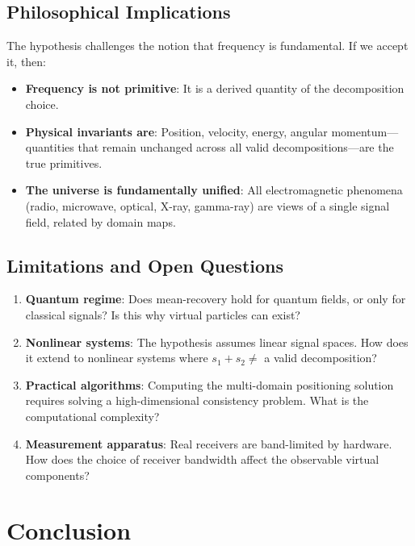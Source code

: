 \documentclass[twocolumn,11pt,a4paper]{article}
\newcommand{\signal}{s}
\begin{document}
\subsection{Philosophical Implications}

The hypothesis challenges the notion that frequency is fundamental. If we accept it, then:

\begin{itemize}[nosep]
  \item \textbf{Frequency is not primitive}: It is a derived quantity of the decomposition choice.

  \item \textbf{Physical invariants are}: Position, velocity, energy, angular momentum—quantities that remain unchanged across all valid decompositions—are the true primitives.

  \item \textbf{The universe is fundamentally unified}: All electromagnetic phenomena (radio, microwave, optical, X-ray, gamma-ray) are views of a single signal field, related by domain maps.
\end{itemize}

\subsection{Limitations and Open Questions}

\begin{enumerate}[nosep]
  \item \textbf{Quantum regime}: Does mean-recovery hold for quantum fields, or only for classical signals? Is this why virtual particles can exist?

  \item \textbf{Nonlinear systems}: The hypothesis assumes linear signal spaces. How does it extend to nonlinear systems where $\signal_1 + \signal_2 \neq$ a valid decomposition?

  \item \textbf{Practical algorithms}: Computing the multi-domain positioning solution requires solving a high-dimensional consistency problem. What is the computational complexity?

  \item \textbf{Measurement apparatus}: Real receivers are band-limited by hardware. How does the choice of receiver bandwidth affect the observable virtual components?
\end{enumerate}

\section{Conclusion}
\label{sec:conclusion}
\end{document}
